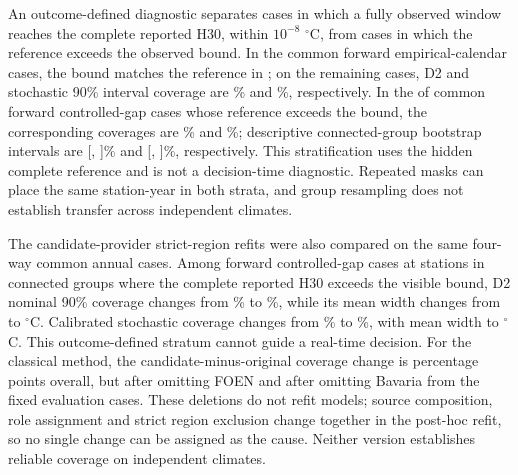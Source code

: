 \documentclass[draft,linenumbers]{agujournal2025}
\begin{document}
An outcome-defined diagnostic separates cases in which a fully observed window reaches the complete reported H30, within $10^{-8}$ $^{\circ}$C, from cases in which the reference exceeds the observed bound. In the \PVCalendarAll{} common forward empirical-calendar cases, the bound matches the reference in \PVCalendarVisible{}; on the remaining \PVCalendarHidden{} cases, D2 and stochastic 90\% interval coverage are \PVCalendarDTwoCoverage\% and \PVCalendarClassicCoverage\%, respectively. In the \PVCrossHidden{} of \PVCrossAll{} common forward controlled-gap cases whose reference exceeds the bound, the corresponding coverages are \PVCrossDTwoCoverage\% and \PVCrossClassicCoverage\%; descriptive connected-group bootstrap intervals are [\PVCrossDTwoCILow{}, \PVCrossDTwoCIHigh{}]\% and [\PVCrossClassicCILow{}, \PVCrossClassicCIHigh{}]\%, respectively. This stratification uses the hidden complete reference and is not a decision-time diagnostic. Repeated masks can place the same station-year in both strata, and group resampling does not establish transfer across independent climates.

The candidate-provider strict-region refits were also compared on the same four-way common annual cases. Among \OpenAnnualCases{} forward controlled-gap cases at \OpenAnnualStations{} stations in \OpenAnnualGroups{} connected groups where the complete reported H30 exceeds the visible bound, D2 nominal 90\% coverage changes from \OpenAnnualDTwoOld\% to \OpenAnnualDTwoNew\%, while its mean width changes from \OpenAnnualDTwoWidthOld{} to \OpenAnnualDTwoWidthNew{}$^{\circ}$C. Calibrated stochastic coverage changes from \OpenAnnualClassicOld\% to \OpenAnnualClassicNew\%, with mean width \OpenAnnualClassicWidthOld{} to \OpenAnnualClassicWidthNew{}$^{\circ}$C. This outcome-defined stratum cannot guide a real-time decision. For the classical method, the candidate-minus-original coverage change is \OpenAnnualClassicDelta{} percentage points overall, but \OpenAnnualClassicDropFoen{} after omitting FOEN and \OpenAnnualClassicDropBayern{} after omitting Bavaria from the fixed evaluation cases. These deletions do not refit models; source composition, role assignment and strict region exclusion change together in the post-hoc refit, so no single change can be assigned as the cause. Neither version establishes reliable coverage on independent climates.
\end{document}
